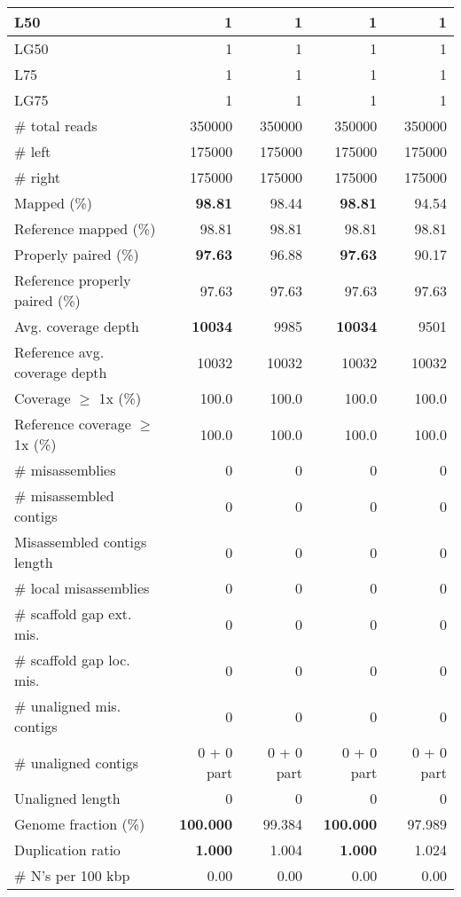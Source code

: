 \documentclass[12pt,a4paper]{article}
\begin{document}
\begin{table}[ht]
\begin{center}
\begin{tabular}{|l*{4}{|r}|}
L50 & 1 & 1 & 1 & 1 \\ \hline
LG50 & 1 & 1 & 1 & 1 \\ \hline
L75 & 1 & 1 & 1 & 1 \\ \hline
LG75 & 1 & 1 & 1 & 1 \\ \hline
\# total reads & 350000 & 350000 & 350000 & 350000 \\ \hline
\# left & 175000 & 175000 & 175000 & 175000 \\ \hline
\# right & 175000 & 175000 & 175000 & 175000 \\ \hline
Mapped (\%) & {\bf 98.81} & 98.44 & {\bf 98.81} & 94.54 \\ \hline
Reference mapped (\%) & 98.81 & 98.81 & 98.81 & 98.81 \\ \hline
Properly paired (\%) & {\bf 97.63} & 96.88 & {\bf 97.63} & 90.17 \\ \hline
Reference properly paired (\%) & 97.63 & 97.63 & 97.63 & 97.63 \\ \hline
Avg. coverage depth & {\bf 10034} & 9985 & {\bf 10034} & 9501 \\ \hline
Reference avg. coverage depth & 10032 & 10032 & 10032 & 10032 \\ \hline
Coverage $\geq$ 1x (\%) & 100.0 & 100.0 & 100.0 & 100.0 \\ \hline
Reference coverage $\geq$ 1x (\%) & 100.0 & 100.0 & 100.0 & 100.0 \\ \hline
\# misassemblies & 0 & 0 & 0 & 0 \\ \hline
\# misassembled contigs & 0 & 0 & 0 & 0 \\ \hline
Misassembled contigs length & 0 & 0 & 0 & 0 \\ \hline
\# local misassemblies & 0 & 0 & 0 & 0 \\ \hline
\# scaffold gap ext. mis. & 0 & 0 & 0 & 0 \\ \hline
\# scaffold gap loc. mis. & 0 & 0 & 0 & 0 \\ \hline
\# unaligned mis. contigs & 0 & 0 & 0 & 0 \\ \hline
\# unaligned contigs & 0 + 0 part & 0 + 0 part & 0 + 0 part & 0 + 0 part \\ \hline
Unaligned length & 0 & 0 & 0 & 0 \\ \hline
Genome fraction (\%) & {\bf 100.000} & 99.384 & {\bf 100.000} & 97.989 \\ \hline
Duplication ratio & {\bf 1.000} & 1.004 & {\bf 1.000} & 1.024 \\ \hline
\# N's per 100 kbp & 0.00 & 0.00 & 0.00 & 0.00 \\ \hline

\end{tabular}
\end{center}
\end{table}
\end{document}
